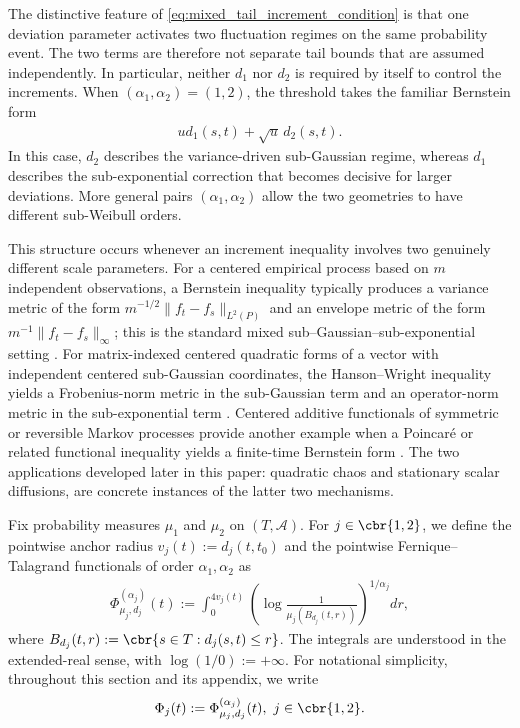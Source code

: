 \documentclass[11pt]{article}
\begin{document}
The distinctive feature of
\eqref{eq:mixed_tail_increment_condition} is that one deviation
parameter activates two fluctuation regimes on the same probability
event. The two terms are therefore not separate tail bounds that are
assumed independently. In particular, neither $d_1$ nor $d_2$ is
required by itself to control the increments. When
$(\alpha_1,\alpha_2)=(1,2)$, the threshold takes the familiar
Bernstein form
\begin{align*}
u d_1(s,t)+\sqrt{u}\,d_2(s,t).
\end{align*}
In this case, $d_2$ describes the variance-driven sub-Gaussian regime,
whereas $d_1$ describes the sub-exponential correction that becomes
decisive for larger deviations. More general pairs
$(\alpha_1,\alpha_2)$ allow the two geometries to have different
sub-Weibull orders.

This structure occurs whenever an increment inequality involves two
genuinely different scale parameters. For a centered empirical process
based on $m$ independent observations, a Bernstein inequality typically
produces a variance metric of the form
$m^{-1/2}\|f_t-f_s\|_{L^2(P)}$ and an envelope metric of the form
$m^{-1}\|f_t-f_s\|_\infty$; this is the standard mixed
sub--Gaussian–sub-exponential setting \citep{dirksen2015tail}. For matrix-indexed centered quadratic forms of
a vector with independent centered sub-Gaussian coordinates, the
Hanson–Wright inequality yields a Frobenius-norm metric in the
sub-Gaussian term and an operator-norm metric in the sub-exponential
term \citep{rudelson2013hanson}. Centered additive functionals of
symmetric or reversible Markov processes provide another example when
a Poincar\'e or related functional inequality yields a finite-time
Bernstein form \citep{gao2014bernstein}. The two
applications developed later in this paper: quadratic chaos and
stationary scalar diffusions, are concrete instances of the latter
two mechanisms.



Fix probability measures $\mu_1$ and $\mu_2$ on
$(T,\mathcal A)$. For
$j\in\cbr{1,2}$, we define the pointwise anchor radius $v_j(t):=d_j(t,t_0)$
and the pointwise Fernique–Talagrand functionals of order $\alpha_1, \alpha_2$ \citep{xu2026} as
\begin{align*}
\Phi_{\mu_j,d_j}^{(\alpha_j)}(t)
:=
\int_0^{4v_j(t)}
\left(
\log\frac{1}{\mu_j(B_{d_j}(t,r))}
\right)^{1/\alpha_j}dr,
\end{align*}
where $B_{d_j}(t,r)
:=
\cbr{s\in T:d_j(s,t)\le r}$. The integrals are understood in the extended-real sense, with
$\log(1/0):=+\infty$. For notational simplicity, throughout this
section and its appendix, we write
\begin{align*}
\Phi_j(t)
:=
\Phi_{\mu_j,d_j}^{(\alpha_j)}(t),
\ j\in\cbr{1,2}.
\end{align*}
\end{document}
